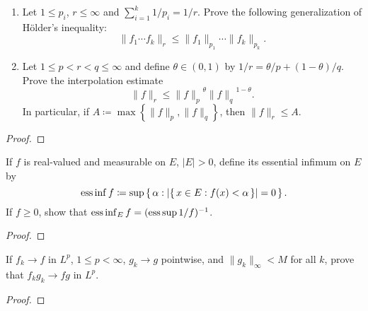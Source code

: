 \begin{problem}
\begin{enumerate}[label=(\alph*)]
\item Let $1\leq p_i$, $r\leq\infty$ and $\sum_{i=1}^k1/p_i=1/r$. Prove the
  following generalization of Hölder's inequality:
\[
\|f_1\dotsm f_k\|_r\leq\|f_1\|_{p_1}\dotsm\|f_k\|_{p_k}.
\]
\item Let $1\leq p<r<q\leq\infty$ and define $\theta\in(0,1)$ by
  $1/r=\theta/p+(1-\theta)/q$. Prove the interpolation estimate
\[
\|f\|_r\leq{\|f\|_p}^\theta{\|f\|_q}^{1-\theta}.
\]
In particular, if $A\coloneqq\max\left\{\|f\|_p,\|f\|_q\right\}$, then
$\|f\|_r\leq A$.
\end{enumerate}
\end{problem}
\begin{proof}
\end{proof}

\begin{problem}
If $f$ is real-valued and measurable on $E$, $|E|>0$, define its essential
infimum on $E$ by
\[
\operatorname*{ess\,inf} f\coloneqq\sup\left\{\,\alpha:|\{\,x\in E:f(x)<\alpha\,\}|=0\,\right\}.
\]
If $f\geq 0$, show that $\operatorname*{ess\,inf}_E f=(\operatorname*{ess\,sup} 1/f)^{-1}$.
\end{problem}
\begin{proof}
\end{proof}

\begin{problem}
If $f_k\to f$ in $L^p$, $1\leq p<\infty$, $g_k\to g$ pointwise, and
$\|g_k\|_\infty<M$ for all $k$, prove that $f_kg_k\to fg$ in $L^p$.
\end{problem}
\begin{proof}
\end{proof}


